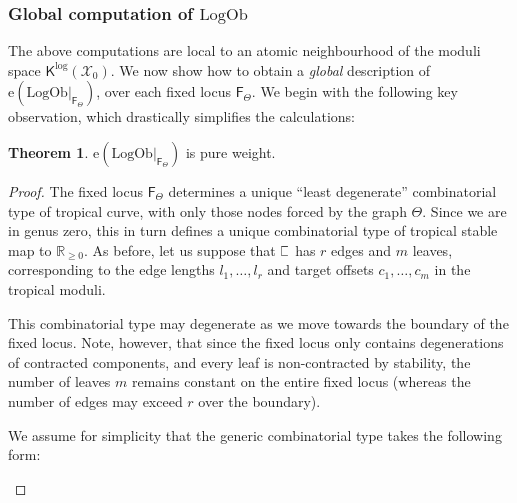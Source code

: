 \documentclass[11pt]{amsart}
\theoremstyle{definition}
\theoremstyle{definition}
\newtheorem{theorem}{Theorem}[section]
\newcommand{\RR}{\mathbb{R}}
\newcommand{\sqC}{\scalebox{0.8}[1.2]{$\sqsubset$}}
\newcommand{\e}{\mathrm{e}}
\newcommand{\LogOb}{\mathrm{LogOb}}
\newcommand{\Xcal}{\mathcal{X}}
\newcommand{\Kup}{\mathsf{K}}
\newcommand{\Fup}{\mathsf{F}}
\begin{document}
\subsubsection{Global computation of $\LogOb$} The above computations are local to an atomic neighbourhood of the moduli space $\Kup^{\log}(\Xcal_0)$. We now show how to obtain a \emph{global} description of $\e(\LogOb|_{\Fup_{\Theta}})$, over each fixed locus $\Fup_{\Theta}$. We begin with the following key observation, which  drastically simplifies the calculations:
\begin{theorem} \label{thm: LogOb pure weight} $\e(\LogOb|_{\Fup_{\Theta}})$ is pure weight.\end{theorem}
\begin{proof}
The fixed locus $\Fup_{\Theta}$ determines a unique ``least degenerate'' combinatorial type of tropical curve, with only those nodes forced by the graph $\Theta$. Since we are in genus zero, this in turn defines a unique combinatorial type of tropical stable map to $\RR_{\geq 0}$. As before, let us suppose that $\sqC$ has $r$ edges and $m$ leaves, corresponding to the edge lengths  $l_1,\ldots,l_r$ and target offsets $c_1,\ldots,c_m$ in the tropical moduli.

This combinatorial type may degenerate as we move towards the boundary of the fixed locus. Note, however, that since the fixed locus only contains degenerations of contracted components, and every leaf is non-contracted by stability, the number of leaves $m$ remains constant on the entire fixed locus (whereas the number of edges may exceed $r$ over the boundary).

We assume for simplicity that the generic combinatorial type takes the following form:
\begin{center}
\end{center}
\end{proof}
\end{document}
